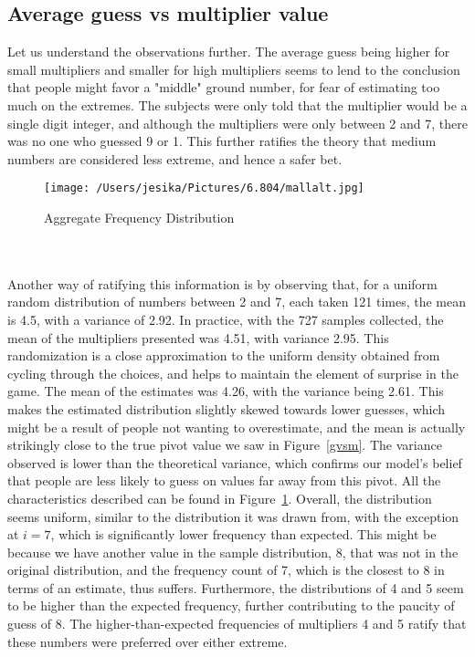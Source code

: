 \documentclass[12pt]{article}
\begin{document}
\subsection{Average guess vs multiplier value}\label{average}
Let us understand the observations further. The average guess being higher for small multipliers and smaller for high multipliers seems to lend to the conclusion that people might favor a "middle" ground number, for fear of estimating too much on the extremes. The subjects were only told that the multiplier would be a single digit integer, and although the multipliers were only between 2 and 7, there was no one who guessed 9 or 1. This further ratifies the theory that medium numbers are considered less extreme, and hence a safer bet. 	
\begin{figure}[!ht]
  \centering
    \texttt{[image: /Users/jesika/Pictures/6.804/mallalt.jpg]}
  \caption{Aggregate Frequency Distribution}
  \label{mallalt}
\end{figure} \\
\\Another way of ratifying this information is by observing that, for a uniform random distribution of numbers between 2 and 7, each taken 121 times, the mean is 4.5, with a variance of 2.92. In practice, with the 727 samples collected, the mean of the multipliers presented was 4.51, with variance 2.95. This randomization is a close approximation to the uniform density obtained from cycling through the choices, and helps to maintain the element of surprise in the game. The mean of the estimates was 4.26, with the variance being 2.61. This makes the estimated distribution slightly skewed towards lower guesses, which might be a result of people not wanting to overestimate, and the mean is actually strikingly close to the true pivot value we saw in Figure~\ref{gvsm}. The variance observed is lower than the theoretical variance, which confirms our model's belief that people are less likely to guess on values far away from this pivot. All the characteristics described can be found in Figure~\ref{mallalt}. Overall, the distribution seems uniform, similar to the distribution it was drawn from, with the exception at $i=7$, which is significantly lower frequency than expected. This might be because we have another value in the sample distribution, 8, that was not in the original distribution, and the frequency count of 7, which is the closest to 8 in terms of an estimate, thus suffers. Furthermore, the distributions of 4 and 5 seem to be higher than the expected frequency, further contributing to the paucity of guess of 8. The higher-than-expected frequencies of multipliers 4 and 5 ratify that these numbers were preferred over either extreme. 
\end{document}
